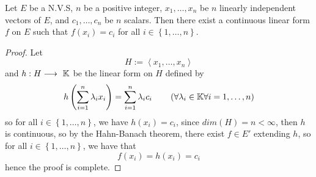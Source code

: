% 
% 
% 
\lecday[2025-05-13]

%  

\begin{theorem}[]
Let $E $ be a N.V.S, $n $ be a positive 
integer, $x_1, \hdots , x_{n} $  be 
$n $ linearly independent vectors of $E $, 
and $c_1, \hdots , c_{n} $   
be $n $ scalars. Then there exist a continuous linear 
form $f $ on $E $ such that 
$f(x_{i}) = c_{i} $  for all $i \in \left\{ 1, \hdots , n \right\}$.
\end{theorem}
\begin{proof}
Let 
\[
H := \left\langle x_1, \hdots , x_n  \right\rangle 
\]
and $ h :H  \longrightarrow \KK  $ be the linear 
form on $H $ defined by 
\[
h \left( 
	\sum_{i=1}^{n} \lambda_{i}  x_{i}
\right)
= \sum_{i=1}^{n} 
\lambda _{i} c_{i} \quad  \quad 
\left( \forall  \lambda_{i} \in  \mathbb{K} \forall i=1, \hdots ,n \right)
\]  
so for all $i \in  \left\{ 1, \hdots , n \right\} $, 
we have $h(x_{i})  = c_{i} $, since 
$dim(H) = n < \infty   $, then $h $ is continuous, so
by the Hahn-Banach theorem, there exist 
$f \in  E' $  extending $h $, so for all 
$i \in  \left\{ 1, \hdots , n \right\} $, we have that 
\[
f(x_{i})  = h(x_{i}) = c_{i} 
\]
hence the proof is complete.
\end{proof}
